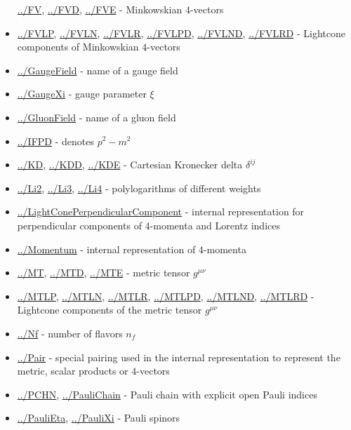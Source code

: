\documentclass[../FeynCalcManual.tex]{subfiles}
\begin{document}
\begin{itemize}
  \hyperlink{../fv}{../FV}, \hyperlink{../fvd}{../FVD},
  \hyperlink{../fve}{../FVE} - Minkowskian \(4\)-vectors
\item
  \hyperlink{../fvlp}{../FVLP}, \hyperlink{../fvln}{../FVLN},
  \hyperlink{../fvlr}{../FVLR}, \hyperlink{../fvlpd}{../FVLPD},
  \hyperlink{../fvlnd}{../FVLND}, \hyperlink{../fvlrd}{../FVLRD} -
  Lightcone components of Minkowskian \(4\)-vectors
\item
  \hyperlink{../gaugefield}{../GaugeField} - name of a gauge field
\item
  \hyperlink{../gaugexi}{../GaugeXi} - gauge parameter \(\xi\)
\item
  \hyperlink{../gluonfield}{../GluonField} - name of a gluon field
\item
  \hyperlink{../ifpd}{../IFPD} - denotes \(p^2 - m^2\)
\item
  \hyperlink{../kd}{../KD}, \hyperlink{../kdd}{../KDD},
  \hyperlink{../kde}{../KDE} - Cartesian Kronecker delta \(\delta^{ij}\)
\item
  \hyperlink{../li2}{../Li2}, \hyperlink{../li3}{../Li3},
  \hyperlink{../li4}{../Li4} - polylogarithms of different weights
\item
  \hyperlink{../lightconeperpendicularcomponent}{../LightConePerpendicularComponent}
  - internal representation for perpendicular components of
  \(4\)-momenta and Lorentz indices
\item
  \hyperlink{../momentum}{../Momentum} - internal representation of
  \(4\)-momenta
\item
  \hyperlink{../mt}{../MT}, \hyperlink{../mtd}{../MTD},
  \hyperlink{../mte}{../MTE} - metric tensor \(g^{\mu \nu}\)
\item
  \hyperlink{../mtlp}{../MTLP}, \hyperlink{../mtln}{../MTLN},
  \hyperlink{../mtlr}{../MTLR}, \hyperlink{../mtlpd}{../MTLPD},
  \hyperlink{../mtlnd}{../MTLND}, \hyperlink{../mtlrd}{../MTLRD} -
  Lightcone components of the metric tensor \(g^{\mu \nu}\)
\item
  \hyperlink{../nf}{../Nf} - number of flavors \(n_f\)
\item
  \hyperlink{../pair}{../Pair} - special pairing used in the internal
  representation to represent the metric, scalar products or
  \(4\)-vectors
\item
  \hyperlink{../pchn}{../PCHN}, \hyperlink{../paulichain}{../PauliChain}
  - Pauli chain with explicit open Pauli indices
\item
  \hyperlink{../paulieta}{../PauliEta},
  \hyperlink{../paulixi}{../PauliXi} - Pauli spinors

\end{itemize}
\end{document}
